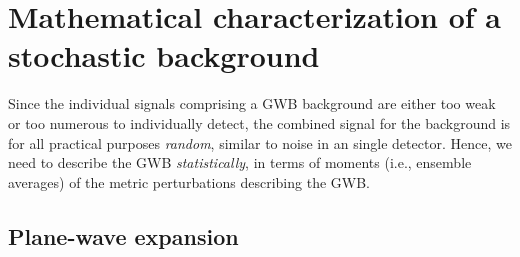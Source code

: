 \section{Mathematical characterization of a stochastic background}
\label{s:mathematical_characterization}

Since the individual signals comprising a GWB 
background are either too weak or too numerous to 
individually detect, the combined signal for the 
background is for all practical purposes 
{\em random}, similar to noise in an single detector.
Hence, we need to describe the GWB {\em statistically}, 
in terms of moments 
(i.e., ensemble averages) of the metric perturbations 
describing the GWB.

\subsection{Plane-wave expansion}
\label{s:plane_wave}

